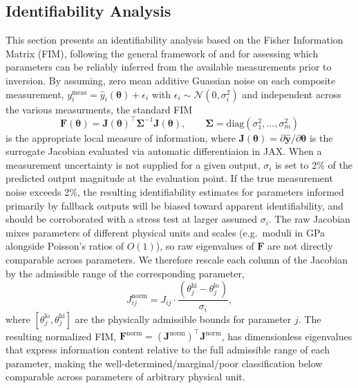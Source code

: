 \documentclass[preprint,review,10pt,number]{elsarticle}
\begin{document}
\subsection{Identifiability Analysis}
This section presents an identifiability analysis based on the Fisher Information Matrix (FIM), following the general framework of \citet{walter1997identification} and \citet{quaiser2009systematic} for assessing which parameters can be reliably inferred from the available measurements prior to inversion.
By assuming, zero mean additive Guassian noise on each composite measurement, $y_i^{\text{meas}} = \hat{y}_i(\boldsymbol{\theta})
+ \epsilon_i$ with $\epsilon_i \sim \mathcal{N}(0, \sigma_i^2)$ and independent across the various measurments, the standard FIM
%
\begin{equation}
    \mathbf{F}(\boldsymbol{\theta}) =
    \mathbf{J}(\boldsymbol{\theta})^\top
    \boldsymbol{\Sigma}^{-1}
    \mathbf{J}(\boldsymbol{\theta}), \qquad
    \boldsymbol{\Sigma} = \mathrm{diag}(\sigma_1^2, \ldots, \sigma_m^2)
    \label{eq:fim}
\end{equation}
%
is the appropriate local measure of information, where $\mathbf{J}(\boldsymbol{\theta}) = \partial\hat{\mathbf{y}}/\partial\boldsymbol{\theta}$ is the surrogate Jacobian evaluated via automatic differentiaion in JAX.
When a measurement uncertainty is not supplied for a given output, $\sigma_i$ is set to 2\% of the predicted output magnitude at the evaluation point.
If the true measurement noise exceeds 2\%, the resulting identifiability estimates for parameters informed primarily by fallback outputs will be biased toward apparent identifiability, and should be corroborated with a stress test at larger assumed $\sigma_i$.
The raw Jacobian mixes parameters of different physical units and scales (e.g.\ moduli in GPa alongside Poisson's ratios of $O(1)$),  so raw eigenvalues of $\mathbf{F}$ are not directly comparable across parameters.
We therefore rescale each column of the Jacobian by the admissible range of the corresponding
parameter,
%
\begin{equation}
    J^{\text{norm}}_{ij} = J_{ij} \cdot \frac{(\theta_j^{\text{hi}} - \theta_j^{\text{lo}})}{\sigma_i},
    \label{eq:jnorm}
\end{equation}
%
where $[\theta_j^{\text{lo}}, \theta_j^{\text{hi}}]$ are the physically admissible bounds for parameter $j$.
The resulting normalized FIM,
$\mathbf{F}^{\text{norm}} = (\mathbf{J}^{\text{norm}})^\top \mathbf{J}^{\text{norm}}$, has dimensionless eigenvalues that express information content relative to the full admissible range of each parameter, making the well-determined/marginal/poor classification below comparable across parameters of arbitrary physical unit.
\end{document}
